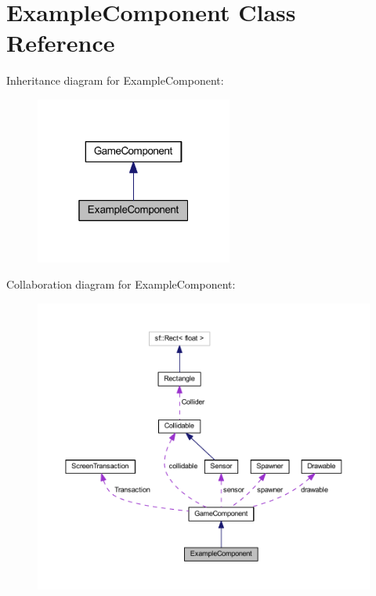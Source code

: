 \hypertarget{class_example_component}{\section{Example\-Component Class Reference}
\label{class_example_component}
}


Inheritance diagram for Example\-Component\-:\nopagebreak
\begin{figure}[H]
\begin{center}
\leavevmode
\includegraphics[width=184pt]{class_example_component__inherit__graph}
\end{center}
\end{figure}


Collaboration diagram for Example\-Component\-:\nopagebreak
\begin{figure}[H]
\begin{center}
\leavevmode
\includegraphics[width=350pt]{class_example_component__coll__graph}
\end{center}
\end{figure}
